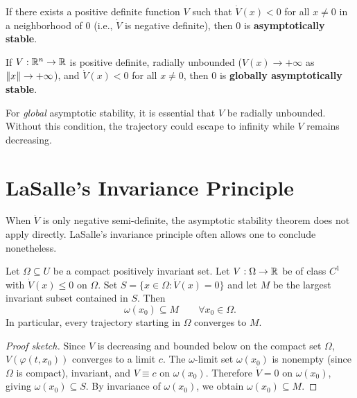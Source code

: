 \begin{theorem}
\label{thm:lyap-asymptotic}
If there exists a positive definite function $V$ such that $\dot{V}(x) < 0$
for all $x \neq 0$ in a neighborhood of $0$ (i.e., $\dot{V}$ is negative
definite), then $0$ is \textbf{asymptotically stable}.
\end{theorem}

\begin{theorem}
\label{thm:barbashin}
If $V : \mathbb{R}^n \to \mathbb{R}$ is positive definite, radially unbounded
($V(x) \to +\infty$ as $\left\| x \right\| \to +\infty$), and $\dot{V}(x) < 0$ for
all $x \neq 0$, then $0$ is \textbf{globally asymptotically stable}.
\end{theorem}

\begin{warning}[title=\textbf{Radially unbounded Lyapunov functions}]
For \emph{global} asymptotic stability, it is essential that $V$ be radially
unbounded. Without this condition, the trajectory could escape to infinity
while $V$ remains decreasing.
\end{warning}

\section{LaSalle's Invariance Principle}

When $\dot{V}$ is only negative semi-definite, the asymptotic stability
theorem does not apply directly. LaSalle's invariance principle often allows
one to conclude nonetheless.

\begin{theorem}
\label{thm:lasalle}
Let $\Omega \subseteq U$ be a compact positively invariant set. Let
$V : \Omega \to \mathbb{R}$ be of class $C^1$ with $\dot{V}(x) \leq 0$ on $\Omega$.
Set $S = \{x \in \Omega : \dot{V}(x) = 0\}$ and let $M$ be the largest
invariant subset contained in $S$. Then
\[
    \omega(x_0) \subseteq M \qquad \forall x_0 \in \Omega.
\]
In particular, every trajectory starting in $\Omega$ converges to $M$.
\end{theorem}

\begin{proof}[Proof sketch]
Since $V$ is decreasing and bounded below on the compact set $\Omega$,
$V(\varphi(t, x_0))$ converges to a limit $c$. The $\omega$-limit set
$\omega(x_0)$ is nonempty (since $\Omega$ is compact), invariant, and
$V \equiv c$ on $\omega(x_0)$. Therefore $\dot{V} = 0$ on $\omega(x_0)$,
giving $\omega(x_0) \subseteq S$. By invariance of $\omega(x_0)$, we
obtain $\omega(x_0) \subseteq M$.
\end{proof}


